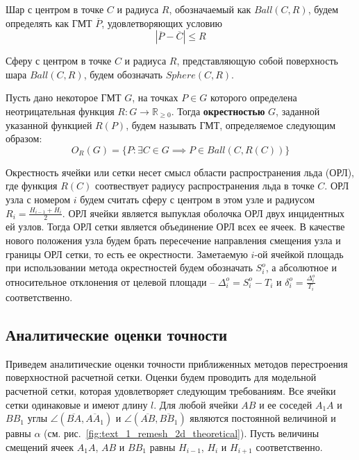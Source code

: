 Шар с центром в точке $C$ и радиуса $R$, обозначаемый как $Ball(C, R)$, будем определять как ГМТ $\overline{P}$, удовлетворяющих условию
\begin{equation}
	|\overline{P} - \overline{C}| \le R
\end{equation}

Сферу с центром в точке $C$ и радиуса $R$, представляющую собой поверхность шара $Ball(C, R)$, будем обозначать $Sphere(C, R)$.

\begin{definition}
Пусть дано некоторое ГМТ\label{abbr:gmt-2} $G$, на точках $P \in G$ которого определена неотрицательная функция $R: G \rightarrow \mathbb{R}_{\ge 0}$.
Тогда \textbf{окрестностью} $G$, заданной указанной функцией $R(P)$, будем называть ГМТ, определяемое следующим образом:
\begin{equation}
	O_R(G) = \{ P: \exists C \in G \implies P \in Ball(C, R(C)) \}
\end{equation}
\end{definition}

Окрестность ячейки или сетки несет смысл области распространения льда (ОРЛ\label{abbr:orl-1}), где функция $R(C)$ соотвествует радиусу распространения льда в точке $C$.
ОРЛ узла с номером $i$ будем считать сферу с центром в этом узле и радиусом $R_i = \frac{H_{i - 1} + H_i}{2}$.
ОРЛ ячейки является выпуклая оболочка ОРЛ двух инцидентных ей узлов.
Тогда ОРЛ сетки является объединение ОРЛ всех ее ячеек.
В качестве нового положения узла будем брать пересечение направления смещения узла и границы ОРЛ сетки, то есть ее окрестности.
Заметаемую $i$-ой ячейкой площадь при использовании метода окрестностей будем обозначать $S_i^o$, а абсолютное и относительное отклонения от целевой площади -- $\Delta_i^o = S_i^o - T_i$ и $\delta_i^o = \frac{\Delta_i^o}{T_i}$ соответственно.


\subsection{Аналитические оценки точности}

Приведем аналитические оценки точности приближенных методов перестроения поверхностной расчетной сетки.
Оценки будем проводить для модельной расчетной сетки, которая удовлетворяет следующим требованиям.
Все ячейки сетки одинаковые и имеют длину $l$.
Для любой ячейки $AB$ и ее соседей $A_1A$ и $BB_1$ углы $\angle (\overline{BA}, \overline{AA_1})$ и $\angle (\overline{AB}, \overline{BB_1})$ являются постоянной величиной и равны $\alpha$ (см. рис.~\ref{fig:text_1_remesh_2d_theoretical}).
Пусть величины смещений ячеек $A_1A$, $AB$ и $BB_1$ равны $H_{i - 1}$, $H_i$ и $H_{i + 1}$ соответственно.

